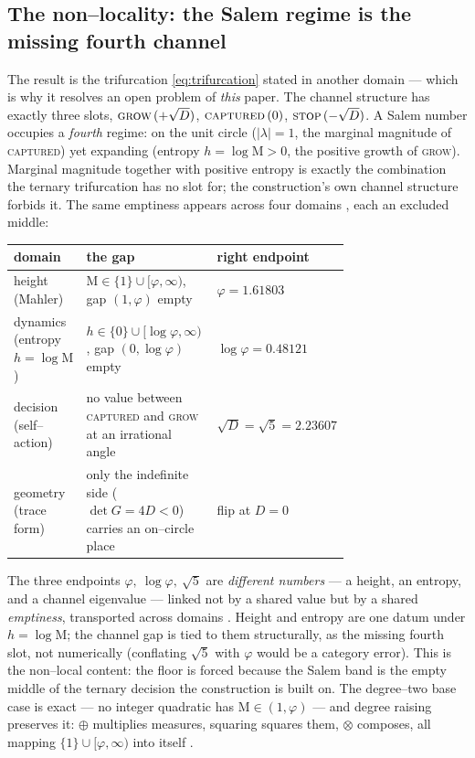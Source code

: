 \documentclass[11pt]{article}
\theoremstyle{plain}
\theoremstyle{definition}
\theoremstyle{remark}
\newcommand{\Mah}{\mathrm{M}}
\newcommand{\abs}[1]{\left\lvert #1 \right\rvert}
\begin{document}
\subsection{The non--locality: the Salem regime is the missing fourth channel}\label{ssec:fourth}

The result is the trifurcation \eqref{eq:trifurcation} stated in another domain --- which is why it resolves an open problem of \emph{this} paper. The channel structure has exactly three slots, $\textsc{grow}\,(+\sqrt D)$, $\textsc{captured}\,(0)$, $\textsc{stop}\,(-\sqrt D)$. A Salem number occupies a \emph{fourth} regime: on the unit circle ($\abs\lambda=1$, the marginal magnitude of \textsc{captured}) yet expanding (entropy $h=\log\Mah>0$, the positive growth of \textsc{grow}). Marginal magnitude together with positive entropy is exactly the combination the ternary trifurcation has no slot for; the construction's own channel structure forbids it. The same emptiness appears across four domains \cite[\S8]{EG}, each an excluded middle:
\begin{center}
\renewcommand{\arraystretch}{1.3}
\begin{tabular}{@{}p{0.23\linewidth} p{0.50\linewidth} l@{}}
\toprule
domain & the gap & right endpoint \\
\midrule
height (Mahler) & $\Mah\in\{1\}\cup[\varphi,\infty)$, gap $(1,\varphi)$ empty & $\varphi=1.61803$ \\
dynamics (entropy $h=\log\Mah$) & $h\in\{0\}\cup[\log\varphi,\infty)$, gap $(0,\log\varphi)$ empty & $\log\varphi=0.48121$ \\
decision (self--action) & no value between \textsc{captured} and \textsc{grow} at an irrational angle & $\sqrt D=\sqrt5=2.23607$ \\
geometry (trace form) & only the indefinite side ($\det G=4D<0$) carries an on--circle place & flip at $D=0$ \\
\bottomrule
\end{tabular}
\end{center}
The three endpoints $\varphi,\ \log\varphi,\ \sqrt5$ are \emph{different numbers} --- a height, an entropy, and a channel eigenvalue --- linked not by a shared value but by a shared \emph{emptiness}, transported across domains \cite[Rem 8.1]{EG}. Height and entropy are one datum under $h=\log\Mah$; the channel gap is tied to them structurally, as the missing fourth slot, not numerically (conflating $\sqrt5$ with $\varphi$ would be a category error). This is the non--local content: the floor is forced because the Salem band is the empty middle of the ternary decision the construction is built on. The degree--two base case is exact --- no integer quadratic has $\Mah\in(1,\varphi)$ \cite[Lem 6.1]{EG} --- and degree raising preserves it: $\oplus$ multiplies measures, squaring squares them, $\otimes$ composes, all mapping $\{1\}\cup[\varphi,\infty)$ into itself \cite[Lem 6.2]{EG}.
\end{document}
